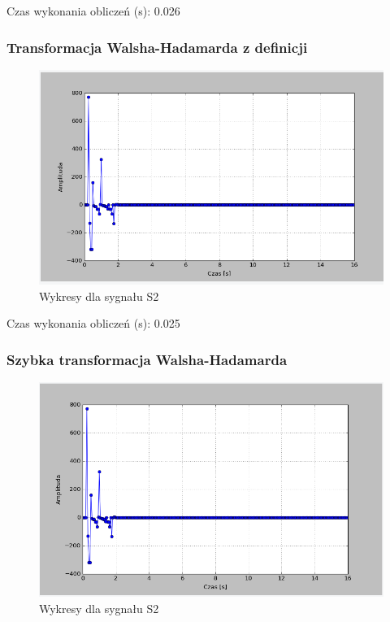 \documentclass{article}
\begin{document}
{                Czas wykonania obliczeń (s): 0.026
            
            \subsubsection{Transformacja Walsha-Hadamarda z definicji}

            
                \begin{figure}[h!]
                    \centering
                    \includegraphics[width=1\textwidth]{img/walshs2.png}
                    \caption{Wykresy dla sygnału S2}
                \end{figure}
                \FloatBarrier

                Czas wykonania obliczeń (s): 0.025 
            
            \subsubsection{Szybka transformacja Walsha-Hadamarda}

            
                \begin{figure}[h!]
                    \centering
                    \includegraphics[width=1\textwidth]{img/fwalshs2.png}
                    \caption{Wykresy dla sygnału S2}
                \end{figure}
                \FloatBarrier

}
\end{document}
